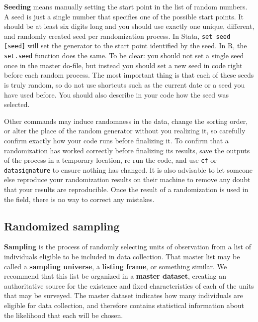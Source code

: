 \textbf{Seeding} means manually setting the start point in the list of random numbers.
A seed is just a single number that specifies one of the possible start points.
It should be at least six digits long and you should use exactly
one unique, different, and randomly created seed per randomization process.
In Stata, \texttt{set seed [seed]} will set the generator
to the start point identified by the seed.
In R, the \texttt{set.seed} function does the same.
To be clear: you should not set a single seed once in the master do-file,
but instead you should set a new seed in code right before each random process.
The most important thing is that each of these seeds is truly random,
so do not use shortcuts such as the current date or a seed you have used before.
You should also describe in your code how the seed was selected.

Other commands may induce randomness in the data,
change the sorting order,
or alter the place of the random generator without you realizing it,
so carefully confirm exactly how your code runs before finalizing it.
To confirm that a randomization has worked correctly before finalizing its results,
save the outputs of the process in a temporary location,
re-run the code, and use \texttt{cf} or \texttt{datasignature} to ensure
nothing has changed. It is also advisable to let someone else reproduce your
randomization results on their machine to remove any doubt that your results
are reproducible.
Once the result of a randomization is used in the field,
there is no way to correct any mistakes.




\subsection{Randomized sampling}

\textbf{Sampling} is the process of randomly selecting units of observation
from a list of individuals eligible to be included in data collection.
That master list may be called a \textbf{sampling universe}, a \textbf{listing frame}, or something similar.
We recommend that this list be organized in a \textbf{master dataset},
creating an authoritative source for the existence and fixed
characteristics of each of the units that may be surveyed.
The master dataset indicates how many individuals are eligible for data collection,
and therefore contains statistical information about
the likelihood that each will be chosen.

